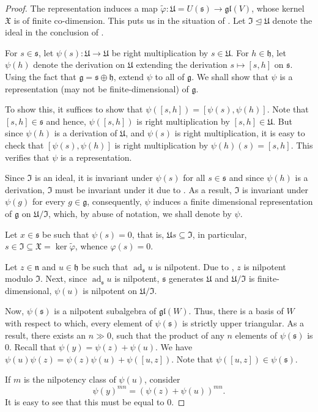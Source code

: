 \documentclass[12pt]{article}
\theoremstyle{thmstyle}
\theoremstyle{defstyle}
\newcommand{\frakg}{\mathfrak{g}}
\newcommand{\frakh}{\mathfrak{h}}
\newcommand{\frakn}{\mathfrak{n}} %
\newcommand{\fraks}{\mathfrak{s}}
\newcommand{\frakI}{\mathfrak{I}}
\newcommand{\frakU}{\mathfrak{U}}
\newcommand{\frakX}{\mathfrak{X}}
\newcommand{\wt}[1]{\widetilde{#1}}
\newcommand{\gl}{\mathfrak{gl}}
\newcommand{\ad}{\operatorname{ad}}
\begin{document}
\begin{proof}
    The representation induces a map $\wt\varphi: \frakU = U(\fraks)\to\gl(V)$, whose kernel $\frakX$ is of finite co-dimension. This puts us in the situation of . Let $\frakI\unlhd\frakU$ denote the ideal in the conclusion of .

    For $s\in\fraks$, let $\psi(s):\frakU\to\frakU$ be right multiplication by $s\in\frakU$. For $h\in\frakh$, let $\psi(h)$ denote the derivation on $\frakU$ extending the derivation $s\mapsto[s, h]$ on $\fraks$. Using the fact that $\frakg = \fraks\oplus\frakh$, extend $\psi$ to all of $\frakg$. We shall show that $\psi$ is a representation (may not be finite-dimensional) of $\frakg$. 
    
    To show this, it suffices to show that $\psi([s, h]) = [\psi(s), \psi(h)]$. Note that $[s,h]\in\fraks$ and hence, $\psi([s,h])$ is right multiplication by $[s, h]\in\frakU$. But since $\psi(h)$ is a derivation of $\frakU$, and $\psi(s)$ is right multiplication, it is easy to check that $[\psi(s), \psi(h)]$ is right multiplication by $\psi(h)(s) = [s, h]$. This verifies that $\psi$ is a representation. 

    Since $\frakI$ is an ideal, it is invariant under $\psi(s)$ for all $s\in\fraks$ and since $\psi(h)$ is a derivation, $\frakI$ must be invariant under it due to . As a result, $\frakI$ is invariant under $\psi(g)$ for every $g\in\frakg$, consequently, $\psi$ induces a finite dimensional representation of $\frakg$ on $\frakU/\frakI$, which, by abuse of notation, we shall denote by $\psi$.

    Let $x\in\fraks$ be such that $\psi(s) = 0$, that is, $\frakU s\subseteq\frakI$, in particular, $s\in\frakI\subseteq\frakX = \ker\wt\varphi$, whence $\varphi(s) = 0$.

    Let $z\in\frakn$ and $u\in\frakh$ be such that $\ad_\fraks u$ is nilpotent. Due to , $z$ is nilpotent modulo $\frakI$. Next, since $\ad_\fraks u$ is nilpotent, $\fraks$ generates $\frakU$ and $\frakU/\frakI$ is finite-dimensional, $\psi(u)$ is nilpotent on $\frakU/\frakI$.

    Now, $\psi(\fraks)$ is a nilpotent subalgebra of $\gl(W)$. Thus, there is a basis of $W$ with respect to which, every element of $\psi(\fraks)$ is strictly upper triangular. As a result, there exists an $n\gg 0$, such that the product of any $n$ elements of $\psi(\fraks)$ is $0$. Recall that $\psi(y) = \psi(z) + \psi(u)$. We have $\psi(u)\psi(z) = \psi(z)\psi(u) + \psi([u, z])$. Note that $\psi([u, z])\in\psi(\fraks)$.

    If $m$ is the nilpotency class of $\psi(u)$, consider 
    \begin{equation*}
        \psi(y)^{mn} = \left(\psi(z) + \psi(u)\right)^{mn}.
    \end{equation*}
    It is easy to see that this must be equal to $0$. 
\end{proof}
\end{document}
